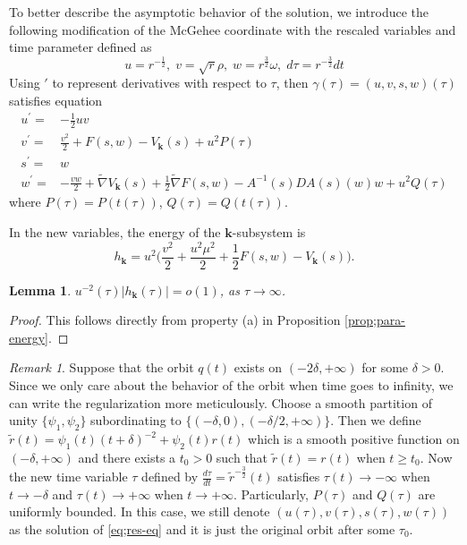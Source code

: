 \documentclass[11pt]{amsart}
\newtheorem{lemma}[theorem]{Lemma}
\theoremstyle{definition}
\theoremstyle{remark}
\newtheorem{remark}[theorem]{Remark}
\numberwithin{equation}{section}
\newcommand{\gm}{\gamma}
\newcommand{\bk}{\mathbf k}
\begin{document}
To better describe the asymptotic behavior of the solution, we introduce the following modification of the McGehee coordinate with the rescaled variables and time parameter defined as
\begin{equation} \label{eq;McGehee-para}
u=r^{-\frac{1}{2}}, \; v=\sqrt{r}\rho, \; w=r^{\frac{3}{2}}\omega, \; d \tau = r^{-\frac{3}{2}} dt
\end{equation}
Using $'$ to represent derivatives with respect to $\tau$, then $\gm(\tau)=(u,v,s,w)(\tau)$ satisfies equation
\begin{equation}
\label{eq;res-eq}
    \begin{aligned}
        u^\prime=&-\frac{1}{2}uv\\
        v^\prime=&\frac{v^2}{2}+F(s,w)-V_{\mathbf{k}}(s)+u^2P(\tau)\\
        s^\prime=&w\\
        w^\prime=&-\frac{vw}{2}+\tilde{\nabla}V_{\mathbf{k}}(s)+\frac{1}{2}\tilde{\nabla}F(s,w)-A^{-1}(s)DA(s)(w)w+u^2Q(\tau)
    \end{aligned}
\end{equation}
where $P(\tau)=P(t(\tau))$, $Q(\tau)=Q(t(\tau))$.  

In the new variables, the energy of the $\bk$-subsystem is
\begin{equation}
\label{eq;eng-eq2}
    h_{\mathbf{k}}=u^2\Big(\frac{v^2}{2}+\frac{u^2\mu^2}{2}+\frac{1}{2}F(s,w)-V_{\mathbf{k}}(s)\Big).
\end{equation}

\begin{lemma}
\label{lem;hk-est-2} $u^{-2}(\tau)|h_{\mathbf{k}}(\tau)| = o(1)$, as $\tau \to \infty$. 
\end{lemma}

\begin{proof}
 This follows directly from property (a) in Proposition \ref{prop;para-energy}. 
 \end{proof}  

\begin{remark}
    Suppose that the orbit $q(t)$ exists on $(-2\delta,+\infty)$ for some $\delta>0$. Since we only care about the behavior of the orbit when time goes to infinity, we can write the regularization more meticulously. Choose a smooth partition of unity $\{\psi_1,\psi_2\}$ subordinating to $\{(-\delta,0),(-\delta/2,+\infty)\}$. Then we define $\tilde{r}(t)=\psi_1(t)(t+\delta)^{-2}+\psi_2(t)r(t)$ which is a smooth positive function on $(-\delta,+\infty)$ and there exists a $t_0>0$ such that $\tilde{r}(t)=r(t)$ when $t\ge t_0$. Now the new time variable $\tau$ defined by $\frac{d\tau}{dt}=\tilde{r}^{-\frac{3}{2}}(t)$ satisfies $\tau(t)\rightarrow-\infty$ when $t\rightarrow-\delta$ and $\tau(t)\rightarrow+\infty$ when $t\rightarrow +\infty$. Particularly, $P(\tau)$ and $Q(\tau)$ are uniformly bounded. In this case, we still denote $(u(\tau),v(\tau),s(\tau),w(\tau))$ as the solution of \eqref{eq;res-eq} and it is just the original orbit after some $\tau_0$.
\end{remark}
\end{document}
